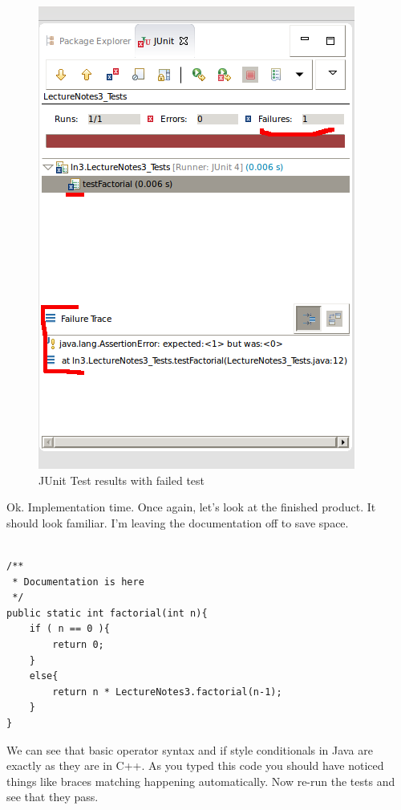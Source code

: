 \documentclass[]{tufte-handout}
\begin{document}
\vspace{.1in}
\begin{center}
\begin{figure}[!htb]
\includegraphics[scale=.5]{Eclipse-TestResult.png}
\caption{JUnit Test results with failed test} 
\label{fig:tests}
\end{figure}
\end{center}
\vspace{.1in}

Ok. Implementation time. Once again, let's look at the finished product. It should look familiar. I'm leaving the documentation off to save space. 

\begin{lstlisting}

/**
 * Documentation is here
 */
public static int factorial(int n){
	if ( n == 0 ){
		return 0;
	}
	else{
		return n * LectureNotes3.factorial(n-1);	
	}
}

\end{lstlisting}

We can see that basic operator syntax and if style conditionals in Java are exactly as they are in C++. As you typed this code you should have noticed things like braces matching happening automatically. Now re-run the tests and see that they pass. 
\end{document}
